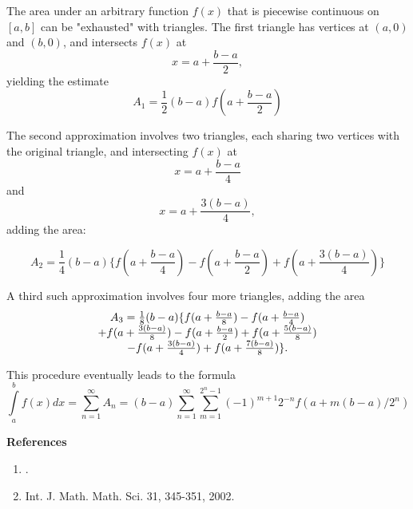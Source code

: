 \documentclass[12pt]{article}
\begin{document}
    The area under an arbitrary function $f(x)$ that is piecewise continuous on $[a,b]$ can be "exhausted" with triangles.  The first triangle has vertices at $(a,0)$ and $(b,0)$, and intersects $f(x)$ at 
\[
x = a + \frac{b - a}{2},
\]
 yielding the estimate
	\[
A_1  = \frac{1}{2}(b - a)f(a + \frac{b - a}{2})
\]


    The second approximation involves two triangles, each sharing two vertices with the original triangle, and intersecting $f(x)$ at \[
x = a + \frac{b - a}{4}
\]
and \[
x = a + \frac{3(b - a)}{4},
\]
 adding the area:

	\[
A_2  = \frac{1}{4}(b - a)\{ f(a + \frac{b - a}{4}) - f(a + \frac{b - a}{2}) + f(a + \frac{3(b - a)}{4})\}
\]

    A third such approximation involves four more triangles, adding the area
	\[
\begin{array}{c}
 A_3 {\rm{ }} = \frac{{{\rm{ }}1}}{8}(b - a)\{ f(a + \frac{b - a}{8}) - f(a + \frac{b - a}{4}) \\ 
  + f(a + \frac{3(b - a)}{8}) - f(a + \frac{b - a}{2}) + f(a + \frac{5(b - a)}{8}) \\ 
  - f(a + \frac{3(b - a)}{4}) + f(a + \frac{7(b - a)}{8})\} . \\ 
 \end{array}
\]

This procedure eventually leads to the formula
\[
\int\limits_a^b {f(x)dx = \sum\limits_{n = 1}^\infty  {A_n }  = \left( {b - a} \right)} \sum\limits_{n = 1}^\infty  {\sum\limits_{m = 1}^{2^n  - 1} {\left( { - 1} \right)^{m + 1} } } 2^{ - n} f\left( {a + m(b - a)/2^n } \right)
\]


{\bf References}

\begin{enumerate}
\item
{}.
\item Int. J. Math. Math. Sci. 31, 345-351, 2002.


\end{enumerate}
\end{document}
